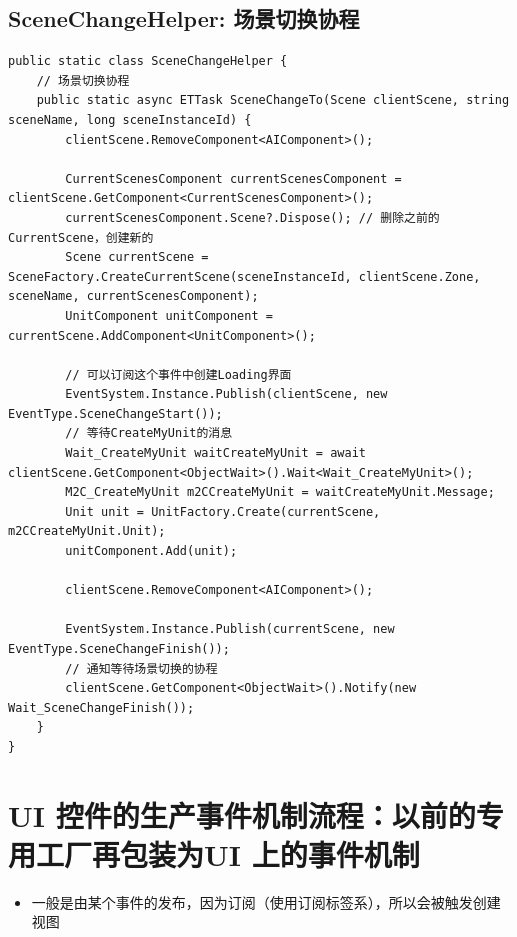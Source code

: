 \documentclass[9pt, b5paper]{article}
\begin{document}
\subsection{SceneChangeHelper: 场景切换协程}
\label{sec-6-4}
\begin{verbatim}
public static class SceneChangeHelper {
    // 场景切换协程
    public static async ETTask SceneChangeTo(Scene clientScene, string sceneName, long sceneInstanceId) {
        clientScene.RemoveComponent<AIComponent>();

        CurrentScenesComponent currentScenesComponent = clientScene.GetComponent<CurrentScenesComponent>();
        currentScenesComponent.Scene?.Dispose(); // 删除之前的CurrentScene，创建新的
        Scene currentScene = SceneFactory.CreateCurrentScene(sceneInstanceId, clientScene.Zone, sceneName, currentScenesComponent);
        UnitComponent unitComponent = currentScene.AddComponent<UnitComponent>();

        // 可以订阅这个事件中创建Loading界面
        EventSystem.Instance.Publish(clientScene, new EventType.SceneChangeStart());
        // 等待CreateMyUnit的消息
        Wait_CreateMyUnit waitCreateMyUnit = await clientScene.GetComponent<ObjectWait>().Wait<Wait_CreateMyUnit>();
        M2C_CreateMyUnit m2CCreateMyUnit = waitCreateMyUnit.Message;
        Unit unit = UnitFactory.Create(currentScene, m2CCreateMyUnit.Unit);
        unitComponent.Add(unit);

        clientScene.RemoveComponent<AIComponent>();

        EventSystem.Instance.Publish(currentScene, new EventType.SceneChangeFinish());
        // 通知等待场景切换的协程
        clientScene.GetComponent<ObjectWait>().Notify(new Wait_SceneChangeFinish());
    }
}
\end{verbatim}


\section{UI 控件的生产事件机制流程：以前的专用工厂再包装为UI 上的事件机制}
\label{sec-7}
\begin{itemize}
\item 一般是由某个事件的发布，因为订阅（使用订阅标签系），所以会被触发创建视图
\end{itemize}
\end{document}
